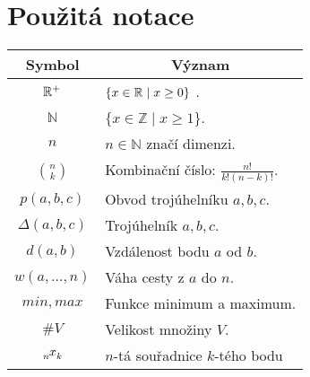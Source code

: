 \chapter*{Použitá notace}
\label{sec:notace}
\noindent
\begin{table}[h]
  \centering
  \begin{tabular}{c l}
    Symbol             & \multicolumn{1}{c}{Význam}               \\
    \toprule
    $\mathbb{R}^+$             & $\{ x \in \mathbb{R} \mid x \geq 0 \}$ .         \\
    $\mathbb{N}$       &$\{ x \in \mathbb{Z} \mid x \geq 1 \} $.  \\
    $n$                & $n \in \mathbb{N}$ značí dimenzi.        \\
    $ \binom{n}{k}$    & Kombinační číslo: $\frac{n!}{k!(n-k)!}$. \\
    $ p(a, b, c)$      & Obvod trojúhelníku $a, b, c$.            \\
    $\Delta(a,b,c)$    & Trojúhelník $a, b, c$.                   \\
    $ d(a, b)$         & Vzdálenost bodu $a$ od $b$.              \\
    $ w(a, \ldots, n)$ & Váha cesty z $a$ do $n$.                 \\
    $min, max$         & Funkce minimum a maximum.                \\
    $ \#V $            & Velikost množiny $V$.                    \\
    $\x{n}{k}$         & $n$-tá souřadnice $k$-tého bodu
  \end{tabular}
\end{table}